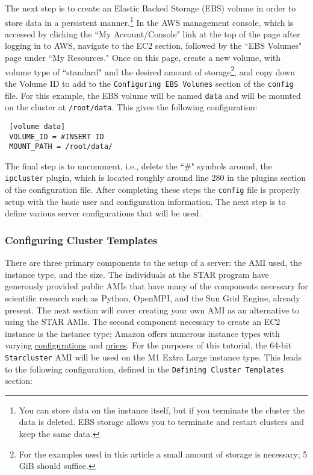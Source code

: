 \documentclass[12pt, letterpaper]{article}
\begin{document}
The next step is to create an Elastic Backed Storage (EBS) volume in order to store data in a 
persistent manner.\footnote{You can store data on the instance itself, but if you terminate the cluster the data
is deleted. EBS storage allows you to terminate and restart clusters and keep the same data.} 
In the AWS management console, which is accessed by clicking the ``My 
Account/Console" link at the top of the page after logging in to AWS, 
navigate to the EC2 section, followed by the ``EBS Volumes" page under ``My 
Resources." Once on this page, create a new volume, with volume type of ``standard" and the 
desired amount of storage\footnote{For the examples used in this article a small amount of storage is necessary; 5 GiB should suffice.}, 
and copy down the Volume ID to add to the \texttt{Configuring EBS Volumes} section of the \texttt{config} file. For this 
example, the EBS volume will be named \texttt{data} and will be mounted on the cluster at 
\texttt{/root/data}. This gives the following configuration:

\begin{verbatim}
 [volume data] 
 VOLUME_ID = #INSERT ID
 MOUNT_PATH = /root/data/ 
\end{verbatim}

The final step is to uncomment, i.e., delete the ``\#" symbols around, the 
\texttt{ipcluster} plugin, which is located roughly around line 280 in the plugins 
section of the configuration file. After completing these steps the \texttt{config} 
file is properly setup with the basic user and configuration information. The 
next step is to define various server configurations that will be used.

\subsubsection*{Configuring Cluster Templates}

There are three primary components to the setup of a server: the AMI used, the 
instance type, and the size. The individuals at the STAR program have generously 
provided public AMIs that have many of the components necessary for scientific 
research such as Python, OpenMPI, and the Sun Grid Engine, already present. The next section will 
cover creating your own AMI as an alternative to using the STAR AMIs. 
The second component necessary to create an EC2 instance is the instance type; Amazon offers 
numerous instance types with varying 
\href{https://aws.amazon.com/ec2/instance-types/}{configurations} and \href{https://aws.amazon.com/ec2 pricing/}{prices}.
For the purposes of this tutorial, the 64-bit \texttt{Starcluster} AMI will be used on 
the M1 Extra Large instance type. This leads to the following configuration, defined in the 
\texttt{Defining Cluster Templates} section:
\end{document}
